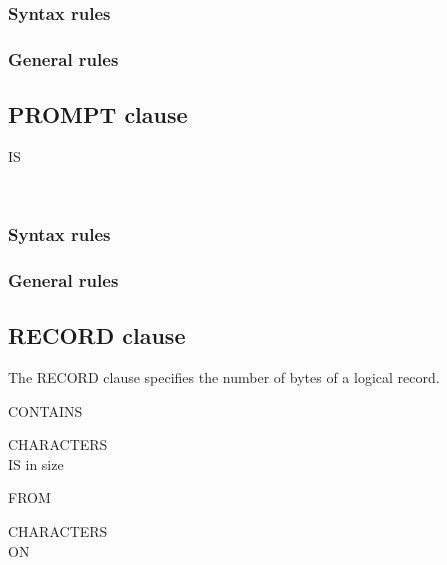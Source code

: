 \subsubsection{Syntax rules}

\subsubsection{General rules}

\subsection{PROMPT clause}

\begin{syntax}[\miscextcolour]
  \begin{0-1}
     IS
    \begin{1=}
      \identifier \\
      \literal
    \end{1=}
  \end{0-1}
\end{syntax}

\subsubsection{Syntax rules}

\subsubsection{General rules}

\subsection{RECORD clause}

The RECORD clause specifies the number of bytes of a logical record.

\begin{syntax}
  \begin{1=}
    CONTAINS \integer
    \begin{0-1}
       \integer
    \end{0-1}
    CHARACTERS \\
    IS  in size
    \begin{0-1}
      FROM \integer
    \end{0-1}
    \begin{0-1}
       \integer
    \end{0-1}
    CHARACTERS \\\qquad
     ON \identifier
  \end{1=}
\end{syntax}

